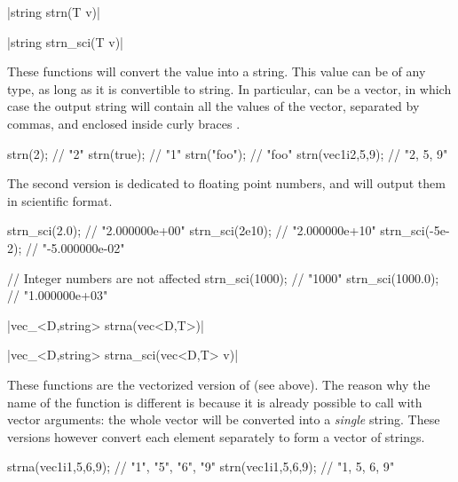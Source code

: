 \item \cppinline|string strn(T v)| 

\cppinline|string strn_sci(T v)| 

These functions will convert the value  into a string. This value can be of any type, as long as it is convertible to string. In particular,  can be a vector, in which case the output string will contain all the values of the vector, separated by commas, and enclosed inside curly braces .

\begin{example}
\begin{cppcode}
strn(2);            // "2"
strn(true);         // "1"
strn("foo");        // "foo"
strn(vec1i{2,5,9}); // "{2, 5, 9}"
\end{cppcode}
\end{example}

The second version is dedicated to floating point numbers, and will output them in scientific format.

\begin{example}
\begin{cppcode}
strn_sci(2.0);    // "2.000000e+00"
strn_sci(2e10);   // "2.000000e+10"
strn_sci(-5e-2);  // "-5.000000e-02"

// Integer numbers are not affected
strn_sci(1000);   // "1000"
strn_sci(1000.0); // "1.000000e+03"
\end{cppcode}
\end{example}

\item \cppinline|vec_<D,string> strna(vec<D,T>)| 

\cppinline|vec_<D,string> strna_sci(vec<D,T> v)| 

These functions are the vectorized version of  (see above). The reason why the name of the function is different is because it is already possible to call  with vector arguments: the whole vector will be converted into a \emph{single} string. These versions however convert each element separately to form a vector of strings.

\begin{example}
\begin{cppcode}
strna(vec1i{1,5,6,9}); // {"1", "5", "6", "9"}
strn(vec1i{1,5,6,9});  // "{1, 5, 6, 9}"
\end{cppcode}
\end{example}

